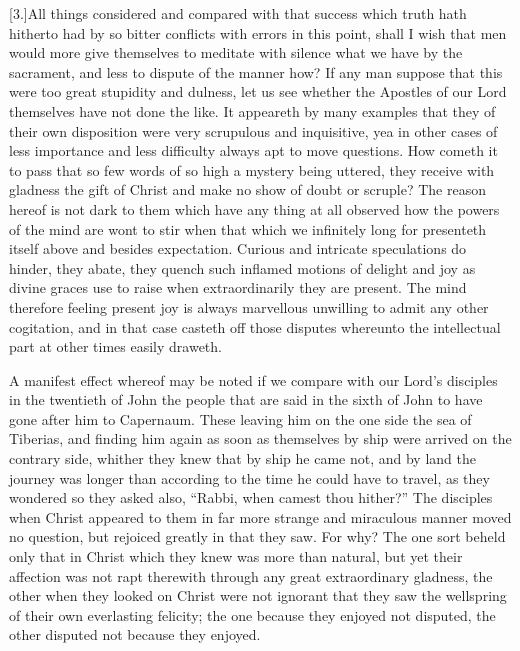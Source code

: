 [3.]All things considered and compared with that success which truth hath hitherto had by so bitter conflicts with errors in this point, shall I wish that men would more give themselves to meditate with silence what we have by the sacrament, and less to dispute of the manner how? If any man suppose that this were too great stupidity and dulness, let us see whether the Apostles of our Lord themselves have not done the like. It appeareth by many examples that they of their own disposition were very scrupulous and inquisitive, yea in other cases of less importance and less difficulty always apt to move questions. How cometh it to pass that so few words of so high a mystery being uttered, they receive with gladness the gift of Christ and make no show of doubt or scruple? The reason hereof is not dark to them which have any thing at all observed how the powers of the mind are wont to stir when that which we infinitely long for presenteth itself above and besides expectation. Curious and intricate speculations do hinder, they abate, they quench such inflamed motions of delight and joy as divine graces use to raise when extraordinarily they are present. The mind therefore feeling present joy is always marvellous unwilling to admit any other cogitation, and in that case casteth off those disputes whereunto the intellectual part at other times easily draweth.

A manifest effect whereof may be noted if we compare with our Lord’s disciples in the twentieth of John the people that are said in the sixth of John to have gone after him to Capernaum. These leaving him on the one side the sea of Tiberias, and finding him again as soon as themselves by ship were arrived on the contrary side, whither they knew that by ship he came not, and by land the journey was longer than according to the time he could have to travel, as they wondered so they asked also, “Rabbi, when camest thou hither?” The disciples when Christ appeared to them in far more strange and miraculous manner moved no question, but rejoiced greatly in that they saw. For why? The one sort beheld only that in Christ which they knew was more than natural, but  yet their affection was not rapt therewith through any great extraordinary gladness, the other when they looked on Christ were not ignorant that they saw the wellspring of their own everlasting felicity;
 the one because they enjoyed not disputed, the other disputed not because they enjoyed.

